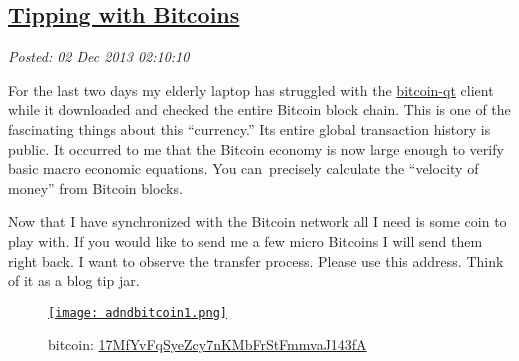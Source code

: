 %

\subsection*{\href{https://bakerjd99.wordpress.com/2013/12/01/tipping-with-bitcoins/}{Tipping with Bitcoins}}


\noindent\emph{Posted: 02 Dec 2013 02:10:10}
\vspace{6pt}

For the last two days my elderly laptop has struggled with
the \href{http://bitcoin.org/en/download}{bitcoin-qt} client while it
downloaded and checked the entire Bitcoin block chain. This is one of
the fascinating things about this ``currency.'' Its entire global
transaction history is public. It occurred to me that the Bitcoin
economy is now large enough to verify basic macro economic equations.
You can~precisely calculate the ``velocity of money'' from Bitcoin
blocks.

Now that I have synchronized with the Bitcoin network all I need is some
coin to play with. If you would like to send me a few micro Bitcoins I
will send them right back. I want to observe the transfer process.
Please use this address. Think of it as a blog tip jar.




\captionsetup[figure]{labelformat=empty}
\begin{figure}[htbp]
\centering
\href{https://blockchain.info/address/17MfYvFqSyeZcy7nKMbFrStFmmvaJ143fA}{\texttt{[image: adndbitcoin1.png]}}
\caption{bitcoin: \href{https://blockchain.info/address/17MfYvFqSyeZcy7nKMbFrStFmmvaJ143fA}{17MfYvFqSyeZcy7nKMbFrStFmmvaJ143fA}}
\label{fig:4347X0}
\end{figure}



%
